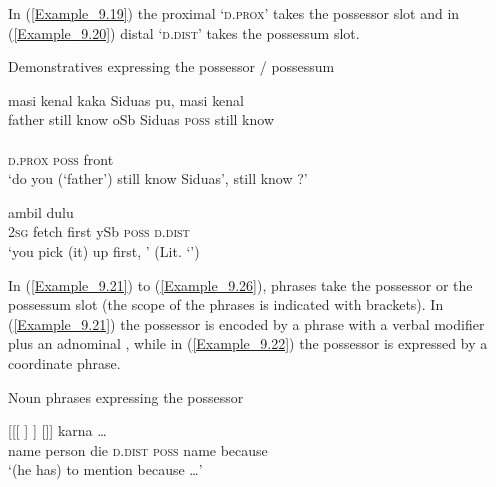 In (\ref{Example_9.19}) the proximal   ‘\textsc{d.prox}’ takes the possessor slot and in (\ref{Example_9.20}) distal  ‘\textsc{d.dist}’ takes the possessum slot.



\begin{styleExampleTitle}
Demonstratives expressing the possessor / possessum
\end{styleExampleTitle}
\ea
\label{Example_9.19}
 {{masi}} {{kenal}} {kaka} {Siduas} {pu,} {masi} {kenal}\\ %
 father  {still}  {know}  oSb  Siduas  \textsc{poss}  still  know\\
  {}  {}\\
 {\textsc{d.prox}}  {\textsc{poss}}  {front}\\
\glt 
‘do you (‘father’) still know Siduas’, still know ?’ \textstyleExampleSource{[080922-001a-CvPh.1123]}
\z

\ea
\label{Example_9.20}
 {ambil} {dulu} {} {} {}\\ %
 \textsc{2sg}  fetch  first  ySb  \textsc{poss}  \textsc{d.dist}\\
\glt 
‘you pick (it) up first, ’ (Lit. ‘’) \textstyleExampleSource{[081006-019-Cv.0002]}
\z



In (\ref{Example_9.21}) to (\ref{Example_9.26}),  phrases take the possessor or the possessum slot (the scope of the  phrases is indicated with brackets). In (\ref{Example_9.21}) the possessor is encoded by a  phrase with a verbal modifier plus an adnominal , while in (\ref{Example_9.22}) the possessor is expressed by a coordinate  phrase.



\begin{styleExampleTitle}
Noun phrases expressing the possessor
\end{styleExampleTitle}

\ea
\label{Example_9.21}
 {[[[} {]} {]} {} {[]]} {karna} {\ldots}\\ %
 name  person  die  \textsc{d.dist}  \textsc{poss}  name  because  \\
\glt 
‘(he has) to mention  because {\ldots}’ \textstyleExampleSource{[080923-013-CvEx.0019]}
\z

